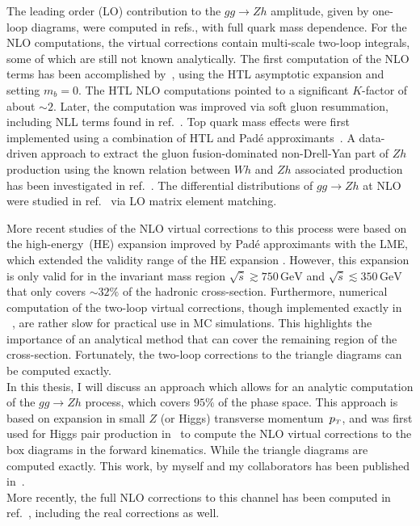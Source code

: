 \par The leading order (LO) contribution to the $g g \rightarrow Z h$ amplitude, given by one-loop diagrams, were computed in refs.\cite{Kniehl:1990iva, Dicus:1988yh}, with full quark mass dependence. For the NLO computations, the virtual corrections contain multi-scale two-loop integrals, some of which are still not known analytically. The first computation of the NLO terms has been accomplished by~\cite{Altenkamp:2012sx}, using the HTL asymptotic expansion and setting $m_b = 0$. The HTL NLO computations pointed to a significant $K$-factor of about $\sim2$.  Later, the computation was improved via soft gluon resummation, including NLL terms found in ref.~\cite{Harlander:2014wda}.  Top quark mass effects were first implemented using a combination of  HTL and Pad\'e approximants~\cite{Hasselhuhn:2016rqt}. A data-driven approach to extract the gluon fusion-dominated non-Drell-Yan part of $Zh$ production using the known relation between  $Wh$
and $ Z h$ associated production has been investigated in ref.~\cite{Harlander:2018yns}. The differential distributions of $g g \rightarrow Zh$  at NLO were studied in ref.~\cite{Hespel:2015zea} via LO matrix element matching. 
\par More recent studies of the NLO virtual corrections to this process were based on the high-energy~(HE) expansion improved by Pad\'e approximants with the LME, which extended the validity range of the HE expansion \cite{Davies:2020drs}. However, this expansion is only valid for in the invariant mass region $\sqrt{\hat{s}}  \gtrsim 750\, \si{\GeV} $ and $\sqrt{\hat{s}}  \lesssim 350\,  \si{\GeV}$ that only covers $\sim 32\%$ of the hadronic cross-section. Furthermore, numerical computation of the two-loop virtual corrections, though implemented exactly in ~\cite{Chen:2020gae}, are rather slow for practical use in MC simulations.  This highlights the importance of an analytical method that can cover the remaining region of the cross-section.  Fortunately, the two-loop corrections to the triangle diagrams can be computed exactly. \\
 In this thesis, I will discuss an approach which allows for an analytic computation of the $gg \to Zh$ process, which covers $95 \%$ of the phase space.  This approach is based on expansion in small  $Z$ (or Higgs) 
 transverse momentum~$p_{\scriptscriptstyle T}$, and was first used for Higgs pair production in~\cite{Bonciani:2018omm} to compute the NLO virtual corrections to the box diagrams in the forward kinematics. While the triangle diagrams are computed exactly. This work, by myself and my collaborators has been published in~\cite{Alasfar:2021ppe}.\\
More recently, the full NLO corrections to this channel has been computed in ref.~\cite{Degrassi2022a}, including the real corrections as well.

